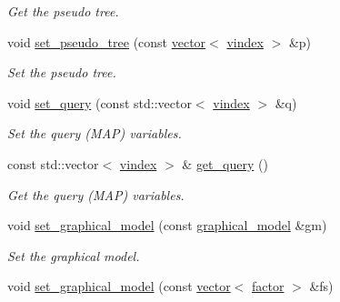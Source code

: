 \begin{DoxyCompactItemize}
\begin{DoxyCompactList}\small\item\em Get the pseudo tree. \end{DoxyCompactList}\item 
void \hyperlink{classmerlin_1_1wmb_a44f662696a361d292f0b0088487ed7a1}{set\+\_\+pseudo\+\_\+tree} (const \hyperlink{classmerlin_1_1vector}{vector}$<$ \hyperlink{classmerlin_1_1wmb_ab942720d1c65e0002674af4eeade660f}{vindex} $>$ \&p)\hypertarget{classmerlin_1_1wmb_a44f662696a361d292f0b0088487ed7a1}{}\label{classmerlin_1_1wmb_a44f662696a361d292f0b0088487ed7a1}

\begin{DoxyCompactList}\small\item\em Set the pseudo tree. \end{DoxyCompactList}\item 
void \hyperlink{classmerlin_1_1wmb_ae17b4c453a873d89925776cfc0773b5d}{set\+\_\+query} (const std\+::vector$<$ \hyperlink{classmerlin_1_1wmb_ab942720d1c65e0002674af4eeade660f}{vindex} $>$ \&q)\hypertarget{classmerlin_1_1wmb_ae17b4c453a873d89925776cfc0773b5d}{}\label{classmerlin_1_1wmb_ae17b4c453a873d89925776cfc0773b5d}

\begin{DoxyCompactList}\small\item\em Set the query (M\+AP) variables. \end{DoxyCompactList}\item 
const std\+::vector$<$ \hyperlink{classmerlin_1_1wmb_ab942720d1c65e0002674af4eeade660f}{vindex} $>$ \& \hyperlink{classmerlin_1_1wmb_a1ff63d89f0dd759ab184712335396393}{get\+\_\+query} ()\hypertarget{classmerlin_1_1wmb_a1ff63d89f0dd759ab184712335396393}{}\label{classmerlin_1_1wmb_a1ff63d89f0dd759ab184712335396393}

\begin{DoxyCompactList}\small\item\em Get the query (M\+AP) variables. \end{DoxyCompactList}\item 
void \hyperlink{classmerlin_1_1wmb_a8308f0c51a3f354e66d38f6639eebadf}{set\+\_\+graphical\+\_\+model} (const \hyperlink{classmerlin_1_1graphical__model}{graphical\+\_\+model} \&gm)\hypertarget{classmerlin_1_1wmb_a8308f0c51a3f354e66d38f6639eebadf}{}\label{classmerlin_1_1wmb_a8308f0c51a3f354e66d38f6639eebadf}

\begin{DoxyCompactList}\small\item\em Set the graphical model. \end{DoxyCompactList}\item 
void \hyperlink{classmerlin_1_1wmb_a5d4249884de8c97b00a5a58ce9b18c56}{set\+\_\+graphical\+\_\+model} (const \hyperlink{classmerlin_1_1vector}{vector}$<$ \hyperlink{classmerlin_1_1factor}{factor} $>$ \&fs)\hypertarget{classmerlin_1_1wmb_a5d4249884de8c97b00a5a58ce9b18c56}{}\label{classmerlin_1_1wmb_a5d4249884de8c97b00a5a58ce9b18c56}


\end{DoxyCompactItemize}
